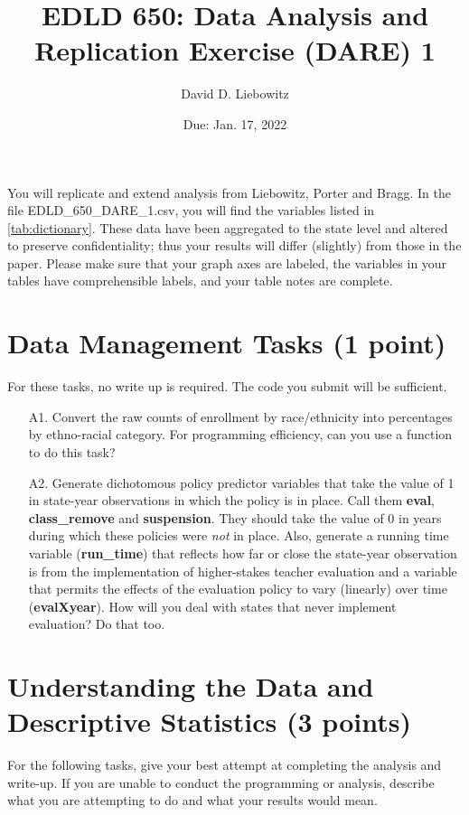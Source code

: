 \documentclass[a4paper, 11pt]{article}
\title{EDLD 650: Data Analysis and Replication Exercise (DARE) 1}
\author{David D. Liebowitz}
\date{Due: Jan. 17, 2022}
\begin{document}
\maketitle

You will replicate and extend analysis from Liebowitz, Porter and Bragg. In the file EDLD\_650\_DARE\_1.csv, you will find the variables listed in \autoref{tab:dictionary}. These data have been aggregated to the state level and altered to preserve confidentiality; thus your results will differ (slightly) from those in the paper. Please make sure that your graph axes are labeled, the variables in your tables have comprehensible labels, and your table notes are complete.



\section{Data Management Tasks (1 point)}
For these tasks, no write up is required. The code you submit will be sufficient.

\begin{enumerate}
	\item[A1.] Convert the raw counts of enrollment by race/ethnicity into percentages by ethno-racial category. For programming efficiency, can you use a function to do this task?
	\item[A2.] Generate dichotomous policy predictor variables that take the value of 1 in state-year observations in which the policy is in place. Call them \textbf{eval}, \textbf{class\_remove} and \textbf{suspension}. They should take the value of 0 in years during which these policies were \textit{not} in place. Also, generate a running time variable (\textbf{run\_time}) that reflects how far or close the state-year observation is from the implementation of higher-stakes teacher evaluation and a variable that permits the effects of the evaluation policy to vary (linearly) over time (\textbf{evalXyear}). How will you deal with states that never implement evaluation? Do that too.
\end{enumerate}

\section{Understanding the Data and Descriptive Statistics (3 points)}
For the following tasks, give your best attempt at completing the analysis and write-up. If you are unable to conduct the programming or analysis, describe what you are attempting to do and what your results would mean.
\end{document}
